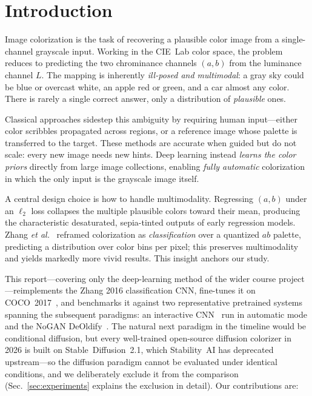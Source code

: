 \section{Introduction}
\label{sec:introduction}

Image colorization is the task of recovering a plausible color image from a
single-channel grayscale input. Working in the CIE~Lab color space, the problem
reduces to predicting the two chrominance channels $(a,b)$ from the luminance
channel $L$. The mapping is inherently \emph{ill-posed and multimodal}: a gray
sky could be blue or overcast white, an apple red or green, and a car almost any
color. There is rarely a single correct answer, only a distribution of
\emph{plausible} ones.

Classical approaches sidestep this ambiguity by requiring human input---either
color scribbles propagated across regions, or a reference image whose palette is
transferred to the target. These methods are accurate when guided but do not
scale: every new image needs new hints. Deep learning instead \emph{learns the
color priors} directly from large image collections, enabling \emph{fully
automatic} colorization in which the only input is the grayscale image itself.

A central design choice is how to handle multimodality. Regressing $(a,b)$ under
an $\ell_2$ loss collapses the multiple plausible colors toward their mean,
producing the characteristic desaturated, sepia-tinted outputs of early
regression models. Zhang \emph{et al.}~\cite{zhang2016colorful} reframed
colorization as \emph{classification} over a quantized $ab$ palette, predicting a
distribution over color bins per pixel; this preserves multimodality and yields
markedly more vivid results. This insight anchors our study.

This report---covering only the deep-learning method of the wider course
project---reimplements the Zhang 2016 classification CNN, fine-tunes it on
COCO~2017~\cite{lin2014coco}, and benchmarks it against two representative
pretrained systems spanning the subsequent paradigms: an interactive
CNN~\cite{zhang2017realtime} run in automatic mode and the NoGAN
DeOldify~\cite{antic2019deoldify}. The natural next paradigm in the timeline
would be conditional diffusion, but every well-trained open-source diffusion
colorizer in 2026 is built on Stable~Diffusion~2.1, which Stability~AI has
deprecated upstream---so the diffusion paradigm cannot be evaluated under
identical conditions, and we deliberately exclude it from the comparison
(Sec.~\ref{sec:experiments} explains the exclusion in detail). Our
contributions are:

